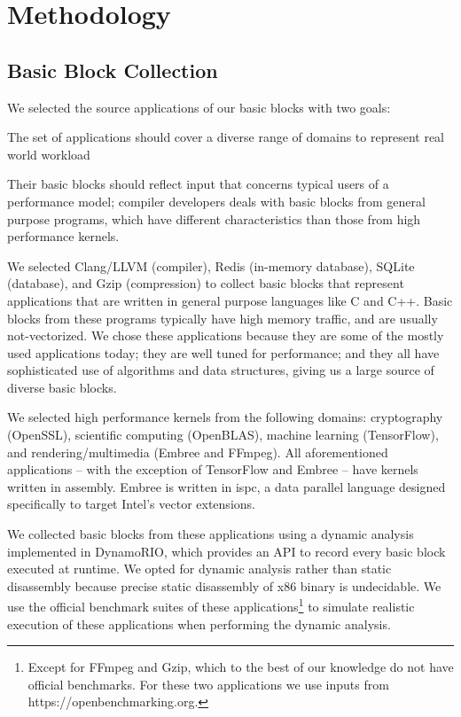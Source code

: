 \section{Methodology}
\subsection{Basic Block Collection}
We selected the source applications of our basic blocks with two goals:
\begin{enumerate*}
    \item The set of applications should cover a diverse range
of domains to represent real world workload
    \item Their basic blocks should reflect input that concerns typical users of a performance model;
    compiler developers deals with
    basic blocks from general purpose programs,
    which have different characteristics
    than those from 
    high performance kernels. 
\end{enumerate*}

We selected Clang/LLVM\cite{llvm} (compiler),
Redis (in-memory database), SQLite (database), and Gzip (compression)
to collect basic blocks that represent
applications that are written in general purpose languages
like C and C++.
Basic blocks from these programs
typically have high memory traffic, and are usually not-vectorized.
We chose these applications because they are some of the mostly used
applications today; they are well tuned for performance;
and they all have sophisticated use of algorithms and data structures,
giving us a large source of diverse basic blocks.

We selected high performance kernels from the following domains:
cryptography (OpenSSL), scientific computing (OpenBLAS),
machine learning (TensorFlow\cite{tensorflow}),
and rendering/multimedia (Embree\cite{embree} and FFmpeg).
All aforementioned applications --
with the exception of TensorFlow and Embree -- 
have kernels written in assembly.
Embree is written in ispc\cite{ispc}, a data parallel language
designed specifically to target Intel's vector extensions.

We collected basic blocks from these applications using
a dynamic analysis implemented in DynamoRIO\cite{dynamorio},
which provides an API to record every basic block
executed at runtime.
We opted for dynamic analysis rather than static disassembly
because precise static disassembly of x86 binary
is undecidable.
We use the official benchmark suites of these applications\footnote{
Except for FFmpeg and Gzip, which to the best of our knowledge do not have
official benchmarks. For these two applications we use inputs
from https://openbenchmarking.org.
} to simulate realistic execution of these applications when performing
the dynamic analysis.

